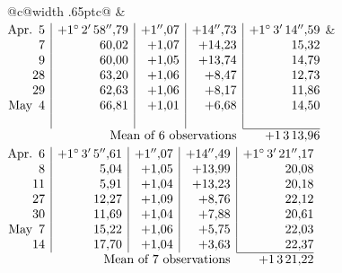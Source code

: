 \noindent\begin{tabular}{@{}c@{\hspace{.4em}\vrule width .65pt\hspace{.4em}}c@{}}
 &
 \\[.18ex]
\(\begin{array}[t]{@{}r|r|r|r|r@{}}
\text{Apr.}\enspace 5 & +1^\circ\,2'\,58''{,}79 & +1''{,}07 & +14''{,}73 & +1^\circ\,3'\,14''{,}59\\
7 & 60{,}02 & +1{,}07 & +14{,}23 & 15{,}32\\
9 & 60{,}00 & +1{,}05 & +13{,}74 & 14{,}79\\
28 & 63{,}20 & +1{,}06 & +8{,}47 & 12{,}73\\
29 & 62{,}63 & +1{,}06 & +8{,}17 & 11{,}86\\
\text{May}\enspace 4 & 66{,}81 & +1{,}01 & +6{,}68 & 14{,}50\\
 & & & & \\
\cline{5-5}
\multicolumn{4}{r}{\text{Mean of 6 observations}} & +1\,3\,13{,}96
\end{array}\)
&
\(\begin{array}[t]{@{}r|r|r|r|r@{}}
\text{Apr.}\enspace 6 & +1^\circ\,3'\,5''{,}61 & +1''{,}07 & +14''{,}49 & +1^\circ\,3'\,21''{,}17\\
8 & 5{,}04 & +1{,}05 & +13{,}99 & 20{,}08\\
11 & 5{,}91 & +1{,}04 & +13{,}23 & 20{,}18\\
27 & 12{,}27 & +1{,}09 & +8{,}76 & 22{,}12\\
30 & 11{,}69 & +1{,}04 & +7{,}88 & 20{,}61\\
\text{May}\enspace 7 & 15{,}22 & +1{,}06 & +5{,}75 & 22{,}03\\
14 & 17{,}70 & +1{,}04 & +3{,}63 & 22{,}37\\
\cline{5-5}
\multicolumn{4}{r}{\text{Mean of 7 observations}} & +1\,3\,21{,}22
\end{array}\)
\end{tabular}\par\medskip

\par\clearpage
\noindent\makebox[12mm][l]{}\par\medskip


